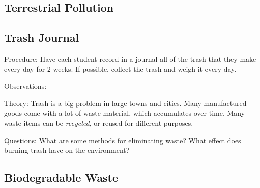 \begin{multicols}{2}
\section*{Terrestrial Pollution}


\subsection{Trash Journal} %


\begin{description*}
\item[Procedure:]{Have each student record in a journal all of the trash that they make every day for 2 weeks. If possible, collect the trash and weigh it every day.}
\item[Observations:]{}
\item[Theory:]{Trash is a big problem in large towns and cities. Many manufactured goods come with a lot of waste material, which accumulates over time. Many waste items can be \emph{recycled}, or reused for different purposes.}
\item[Questions:]{What are some methods for eliminating waste? What effect does burning trash have on the environment?}
\end{description*}

\subsection{Biodegradable Waste}  %



\end{multicols}
